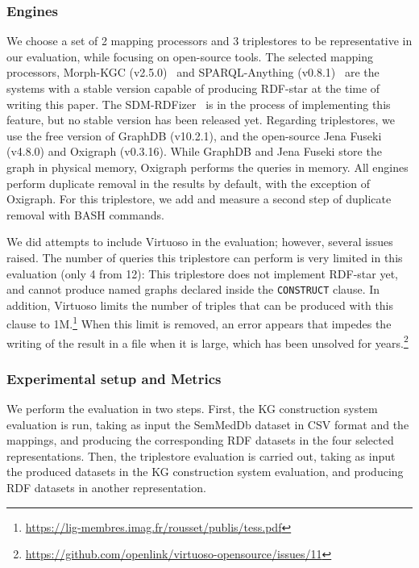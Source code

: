 \subsubsection{Engines}
\label{sec:chp6-1_engines}
We choose a set of 2 mapping processors and 3 triplestores to be representative in our evaluation, while focusing on open-source tools. The selected mapping processors, Morph-KGC (v2.5.0)~\cite{arenas2022morph} and SPARQL-Anything (v0.8.1)~\cite{asprino2023sparql-anything} are the systems with a stable version capable of producing RDF-star at the time of writing this paper. The SDM-RDFizer~\cite{iglesias2020rdfizer} is in the process of implementing this feature, but no stable version has been released yet. Regarding triplestores, we use the free version of GraphDB (v10.2.1), and the open-source Jena Fuseki (v4.8.0) and Oxigraph (v0.3.16). While GraphDB and Jena Fuseki store the graph in physical memory, Oxigraph performs the queries in memory. All engines perform duplicate removal in the results by default, with the exception of Oxigraph. For this triplestore, we add and measure a second step of duplicate removal with BASH commands.


We did attempts to include Virtuoso in the evaluation; however, several issues raised. The number of queries this triplestore can perform is very limited in this evaluation (only 4 from 12): This triplestore
does not implement RDF-star yet, and cannot produce named graphs declared inside the \texttt{CONSTRUCT} clause. In addition, Virtuoso limits the number of triples that can be produced with this clause to 1M.\footnote{\url{https://lig-membres.imag.fr/rousset/publis/tess.pdf}} When this limit is removed, an error appears that impedes the writing of the result in a file when it is large, which has been unsolved for years.\footnote{\url{https://github.com/openlink/virtuoso-opensource/issues/11}} 




\subsubsection{Experimental setup and Metrics}
\label{sec:chp6-1_exp-setup}
We perform the evaluation in two steps. First, the KG construction system evaluation is run, taking as input the SemMedDb dataset in CSV format and the mappings, and producing the corresponding RDF datasets in the four selected representations. Then, the triplestore evaluation is carried out, taking as input the produced datasets in the KG construction system evaluation, and producing RDF datasets in another representation.


